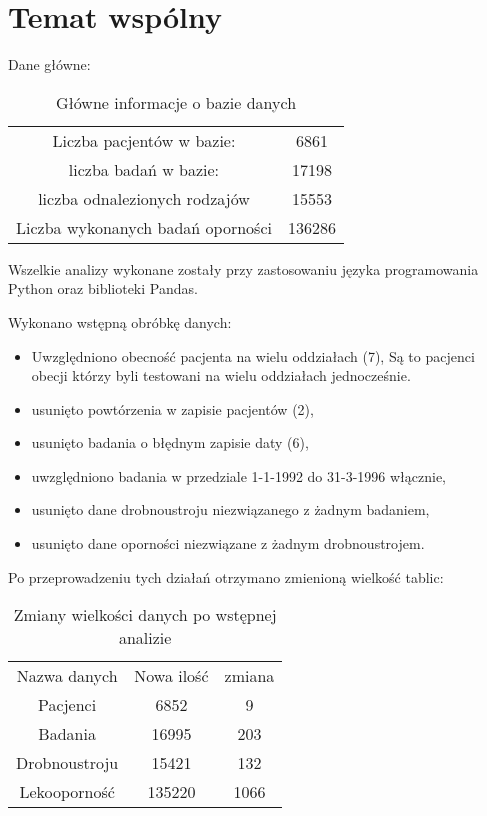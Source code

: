 \documentclass[a4paper,11pt]{article}
\begin{document}
\section{Temat wspólny}

Dane główne:
\begin{table}[H]
\begin{center}
\caption{Główne informacje o bazie danych}
\begin{tabular}{cc}
\hline
Liczba pacjentów w bazie: & 6861 \\
liczba badań w bazie: & 17198 \\
liczba odnalezionych rodzajów & 15553 \\
Liczba wykonanych badań oporności & 136286  \\
\hline
\end{tabular}
\end{center}
\end{table}
Wszelkie analizy wykonane zostały przy zastosowaniu języka programowania Python oraz biblioteki Pandas.

Wykonano wstępną obróbkę danych:
\begin{itemize}
  \item Uwzględniono obecność pacjenta na wielu oddziałach (7), Są to pacjenci obecji którzy byli testowani na wielu oddziałach jednocześnie. 
  \item usunięto powtórzenia w zapisie pacjentów (2), 
  \item usunięto badania o błędnym zapisie daty (6),
  \item uwzględniono badania w przedziale 1-1-1992 do 31-3-1996 włącznie,
  \item usunięto dane drobnoustroju niezwiązanego z żadnym badaniem,
  \item usunięto dane oporności niezwiązane z żadnym drobnoustrojem.
\end{itemize}

Po przeprowadzeniu tych działań otrzymano zmienioną wielkość tablic:
\begin{table}[H]
\begin{center}
\caption{Zmiany wielkości danych po wstępnej analizie}
\begin{tabular}{c|c|c}
\hline
Nazwa danych & Nowa ilość & zmiana \\
Pacjenci & 6852 & 9 \\
Badania & 16995  & 203\\
Drobnoustroju & 15421 & 132\\
Lekooporność & 135220 & 1066 \\
\hline
\end{tabular}
\end{center}
\end{table}
\end{document}
